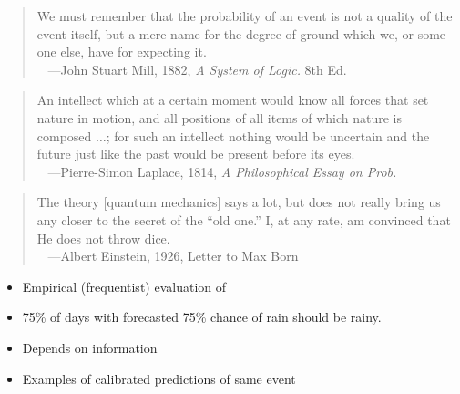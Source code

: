 \documentclass[10pt]{report}
\begin{document}
\begin{quote}
\footnotesize
We must remember that the probability of an event is not a quality of the event itself, but a mere name for the degree of ground which we, or some one else, have for expecting it.
\\ \mbox{ } \hfill {\scriptsize ---John Stuart Mill, 1882, {\it A System of Logic.} 8th Ed.}
\end{quote}
%
\begin{quote}
\footnotesize
An intellect which at a certain moment would know all forces that set nature in motion, and all positions of all items of which nature is composed $\ldots$; for such an intellect nothing would be uncertain and the future just like the past would be present before its eyes.
\\ \mbox{ } \hfill {\scriptsize ---Pierre-Simon Laplace, 1814, {\it A Philosophical Essay on Prob.}}
\end{quote}
%
\begin{quote}
\footnotesize
The theory [quantum mechanics] says a lot, but does not really bring us any closer to the secret of the ``old one.'' I, at any rate, am convinced that He does not throw dice.
\\ \mbox{ } \hfill {\scriptsize ---Albert Einstein, 1926, Letter to Max Born}
\end{quote}

\begin{itemize}
\item Empirical (frequentist) evaluation of 
\item 75\% of days with forecasted 75\% chance of rain should be rainy.
\item Depends on  information
\item Examples of calibrated predictions of same event
\end{itemize}
\end{document}
